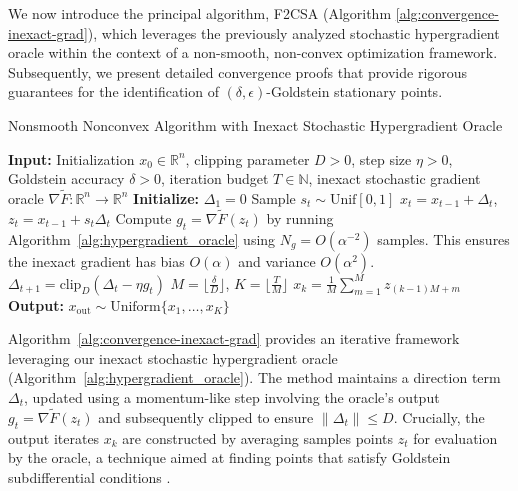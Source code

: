 \documentclass[letterpaper]{article} %
\newcommand{\1}{\mathbf{1}}
\begin{document}
\label{sec:algorithm_convergence}
We now introduce the principal algorithm, F2CSA (Algorithm \ref{alg:convergence-inexact-grad}), which leverages the previously analyzed stochastic hypergradient oracle within the context of a non-smooth, non-convex optimization framework. Subsequently, we present detailed convergence proofs that provide rigorous guarantees for the identification of $(\delta, \epsilon)$-Goldstein stationary points.

\begin{algorithm}[h!]
\caption{Nonsmooth Nonconvex Algorithm with Inexact Stochastic Hypergradient Oracle}
\label{alg:convergence-inexact-grad}
\begin{algorithmic}[1]
\STATE \textbf{Input:} Initialization $x_0 \in \mathbb{R}^n$, clipping parameter $D > 0$, step size $\eta > 0$, Goldstein accuracy $\delta > 0$, iteration budget $T \in \mathbb{N}$, inexact stochastic gradient oracle $\nabla\tilde{F}: \mathbb{R}^n \to \mathbb{R}^n$
\STATE \textbf{Initialize:} $\Delta_1 = 0$
\STATE Sample $s_t \sim \text{Unif}[0, 1]$
\STATE $x_t = x_{t-1} + \Delta_t$, $z_t = x_{t-1} + s_t\Delta_t$
\STATE Compute $g_t = \nabla\tilde{F}(z_t)$ by running Algorithm~\ref{alg:hypergradient_oracle} using $N_g = O(\alpha^{-2})$ samples. This ensures the inexact gradient has bias $O(\alpha)$ and variance $O(\alpha^2)$. %
\STATE $\Delta_{t+1} = \text{clip}_D(\Delta_t - \eta g_t)$ 
\ENDFOR
\STATE $M = \lfloor\frac{\delta}{D}\rfloor$, $K = \lfloor\frac{T}{M}\rfloor$ 
\STATE $x_k = \frac{1}{M}\sum_{m=1}^{M} z_{(k-1)M+m}$
\ENDFOR
\STATE \textbf{Output:} $x_{\text{out}} \sim \text{Uniform}\{x_1, \ldots, x_K\}$
\end{algorithmic}
\end{algorithm}

Algorithm~\ref{alg:convergence-inexact-grad} provides an iterative framework leveraging our inexact stochastic hypergradient oracle (Algorithm~\ref{alg:hypergradient_oracle}). The method maintains a direction term $\Delta_t$, updated using a momentum-like step involving the oracle's output $g_t = \nabla\tilde{F}(z_t)$ and subsequently clipped to ensure $\|\Delta_t\| \le D$. Crucially, the output iterates $x_k$ are constructed by averaging samples points $z_t$ for evaluation by the oracle, a technique aimed at finding points that satisfy Goldstein subdifferential conditions \cite{goldstein1977, zhang2020complexity, davis2019stochastic}.
\end{document}
